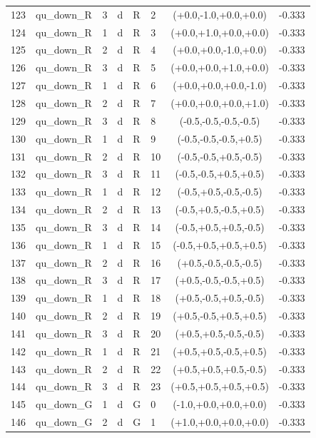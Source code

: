 \begin{longtable}{rlllllcl}
123 & qu\_down\_R & 3 & d & R & 2 & (+0.0,-1.0,+0.0,+0.0) & -0.333 \\
124 & qu\_down\_R & 1 & d & R & 3 & (+0.0,+1.0,+0.0,+0.0) & -0.333 \\
125 & qu\_down\_R & 2 & d & R & 4 & (+0.0,+0.0,-1.0,+0.0) & -0.333 \\
126 & qu\_down\_R & 3 & d & R & 5 & (+0.0,+0.0,+1.0,+0.0) & -0.333 \\
127 & qu\_down\_R & 1 & d & R & 6 & (+0.0,+0.0,+0.0,-1.0) & -0.333 \\
128 & qu\_down\_R & 2 & d & R & 7 & (+0.0,+0.0,+0.0,+1.0) & -0.333 \\
129 & qu\_down\_R & 3 & d & R & 8 & (-0.5,-0.5,-0.5,-0.5) & -0.333 \\
130 & qu\_down\_R & 1 & d & R & 9 & (-0.5,-0.5,-0.5,+0.5) & -0.333 \\
131 & qu\_down\_R & 2 & d & R & 10 & (-0.5,-0.5,+0.5,-0.5) & -0.333 \\
132 & qu\_down\_R & 3 & d & R & 11 & (-0.5,-0.5,+0.5,+0.5) & -0.333 \\
133 & qu\_down\_R & 1 & d & R & 12 & (-0.5,+0.5,-0.5,-0.5) & -0.333 \\
134 & qu\_down\_R & 2 & d & R & 13 & (-0.5,+0.5,-0.5,+0.5) & -0.333 \\
135 & qu\_down\_R & 3 & d & R & 14 & (-0.5,+0.5,+0.5,-0.5) & -0.333 \\
136 & qu\_down\_R & 1 & d & R & 15 & (-0.5,+0.5,+0.5,+0.5) & -0.333 \\
137 & qu\_down\_R & 2 & d & R & 16 & (+0.5,-0.5,-0.5,-0.5) & -0.333 \\
138 & qu\_down\_R & 3 & d & R & 17 & (+0.5,-0.5,-0.5,+0.5) & -0.333 \\
139 & qu\_down\_R & 1 & d & R & 18 & (+0.5,-0.5,+0.5,-0.5) & -0.333 \\
140 & qu\_down\_R & 2 & d & R & 19 & (+0.5,-0.5,+0.5,+0.5) & -0.333 \\
141 & qu\_down\_R & 3 & d & R & 20 & (+0.5,+0.5,-0.5,-0.5) & -0.333 \\
142 & qu\_down\_R & 1 & d & R & 21 & (+0.5,+0.5,-0.5,+0.5) & -0.333 \\
143 & qu\_down\_R & 2 & d & R & 22 & (+0.5,+0.5,+0.5,-0.5) & -0.333 \\
144 & qu\_down\_R & 3 & d & R & 23 & (+0.5,+0.5,+0.5,+0.5) & -0.333 \\
145 & qu\_down\_G & 1 & d & G & 0 & (-1.0,+0.0,+0.0,+0.0) & -0.333 \\
146 & qu\_down\_G & 2 & d & G & 1 & (+1.0,+0.0,+0.0,+0.0) & -0.333 \\

\end{longtable}
